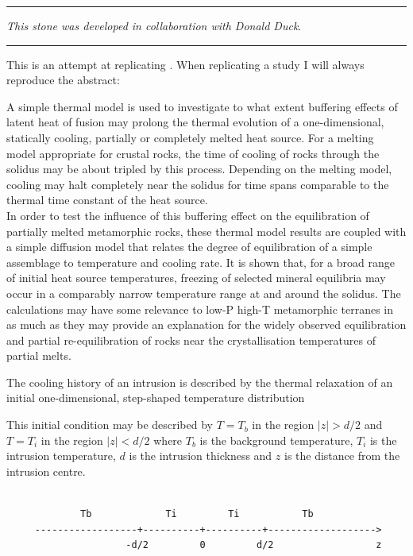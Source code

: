 \par\noindent\rule{\textwidth}{0.4pt}

{\sl This stone was developed in collaboration with Donald Duck}. 

\par\noindent\rule{\textwidth}{0.4pt}


This is an attempt at replicating . 
When replicating a study I will always reproduce the abstract:
\begin{displayquote}
{\color{darkgray}
A simple thermal model is used to investigate to what extent buffering effects of latent heat of fusion may
prolong the thermal evolution of a one-dimensional, statically cooling, partially or completely melted heat source.
For a melting model appropriate for crustal rocks, the time of cooling of rocks through the solidus may be about
tripled by this process. Depending on the melting model, cooling may halt completely near the solidus for time spans
comparable to the thermal time constant of the heat source.\\
In order to test the influence of this buffering effect on the equilibration of partially melted metamorphic rocks,
these thermal model results are coupled with a simple diffusion model that relates the degree of equilibration of a
simple assemblage to temperature and cooling rate. It is shown that, for a broad range of initial heat source
temperatures, freezing of selected mineral equilibria may occur in a comparably narrow temperature range at and
around the solidus. The calculations may have some relevance to low-P high-T metamorphic terranes in as much as
they may provide an explanation for the widely observed equilibration and partial re-equilibration of rocks near the
crystallisation temperatures of partial melts.}
\end{displayquote}



The cooling history of an intrusion is described by the
thermal relaxation of an initial one-dimensional,
step-shaped temperature distribution

This initial condition may be described by $T=T_b$ in the region
$|z|>d/2$ and $T=T_i$ in the region $|z|<d/2$
where $T_b$ is the background temperature,
$T_i$ is the intrusion temperature, $d$ is the intrusion
thickness and $z$ is the distance from the intrusion centre. 
\begin{small}
\begin{verbatim}
     
             Tb             Ti         Ti           Tb
     ------------------+----------+----------+-------------------> 
                     -d/2         0         d/2                  z
\end{verbatim}
\end{small}

